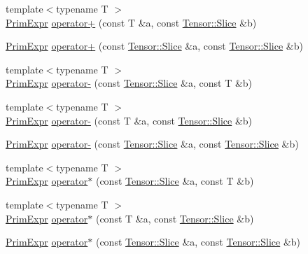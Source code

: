 \begin{DoxyCompactItemize}
\item 
{\footnotesize template$<$typename T $>$ }\\\hyperlink{classtvm_1_1PrimExpr}{Prim\+Expr} \hyperlink{namespacetvm_1_1te_ac979385c6381a7ca0a87ffaa4f60e5ea}{operator+} (const T \&a, const \hyperlink{classtvm_1_1te_1_1Tensor_1_1Slice}{Tensor\+::\+Slice} \&b)
\item 
\hyperlink{classtvm_1_1PrimExpr}{Prim\+Expr} \hyperlink{namespacetvm_1_1te_ab5a98e93df74228039fff60553720999}{operator+} (const \hyperlink{classtvm_1_1te_1_1Tensor_1_1Slice}{Tensor\+::\+Slice} \&a, const \hyperlink{classtvm_1_1te_1_1Tensor_1_1Slice}{Tensor\+::\+Slice} \&b)
\item 
{\footnotesize template$<$typename T $>$ }\\\hyperlink{classtvm_1_1PrimExpr}{Prim\+Expr} \hyperlink{namespacetvm_1_1te_a2f041d85fc4eb81c053099cbbb617d1d}{operator-\/} (const \hyperlink{classtvm_1_1te_1_1Tensor_1_1Slice}{Tensor\+::\+Slice} \&a, const T \&b)
\item 
{\footnotesize template$<$typename T $>$ }\\\hyperlink{classtvm_1_1PrimExpr}{Prim\+Expr} \hyperlink{namespacetvm_1_1te_ab9e6e16a169b217585f10e94552ca5f6}{operator-\/} (const T \&a, const \hyperlink{classtvm_1_1te_1_1Tensor_1_1Slice}{Tensor\+::\+Slice} \&b)
\item 
\hyperlink{classtvm_1_1PrimExpr}{Prim\+Expr} \hyperlink{namespacetvm_1_1te_a0e218dec6bd51cebdbb05fab7d3f07d4}{operator-\/} (const \hyperlink{classtvm_1_1te_1_1Tensor_1_1Slice}{Tensor\+::\+Slice} \&a, const \hyperlink{classtvm_1_1te_1_1Tensor_1_1Slice}{Tensor\+::\+Slice} \&b)
\item 
{\footnotesize template$<$typename T $>$ }\\\hyperlink{classtvm_1_1PrimExpr}{Prim\+Expr} \hyperlink{namespacetvm_1_1te_ae558c447bd0877edf4d5b0e612a735a2}{operator$\ast$} (const \hyperlink{classtvm_1_1te_1_1Tensor_1_1Slice}{Tensor\+::\+Slice} \&a, const T \&b)
\item 
{\footnotesize template$<$typename T $>$ }\\\hyperlink{classtvm_1_1PrimExpr}{Prim\+Expr} \hyperlink{namespacetvm_1_1te_a024b66eea44dbdea15a328e812c75a7f}{operator$\ast$} (const T \&a, const \hyperlink{classtvm_1_1te_1_1Tensor_1_1Slice}{Tensor\+::\+Slice} \&b)
\item 
\hyperlink{classtvm_1_1PrimExpr}{Prim\+Expr} \hyperlink{namespacetvm_1_1te_a3b9149e3bfe9aa3db7112eb94b87a953}{operator$\ast$} (const \hyperlink{classtvm_1_1te_1_1Tensor_1_1Slice}{Tensor\+::\+Slice} \&a, const \hyperlink{classtvm_1_1te_1_1Tensor_1_1Slice}{Tensor\+::\+Slice} \&b)

\end{DoxyCompactItemize}
